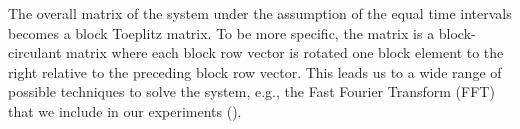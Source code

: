 The overall matrix of the system under the assumption of the equal time intervals becomes a block Toeplitz matrix. To be more specific, the matrix is a block-circulant matrix where each block row vector is rotated one block element to the right relative to the preceding block row vector. This leads us to a wide range of possible techniques to solve the system, e.g., the Fast Fourier Transform (FFT) \cite{mazancourt1983, vescovo1997} that we include in our experiments ().
